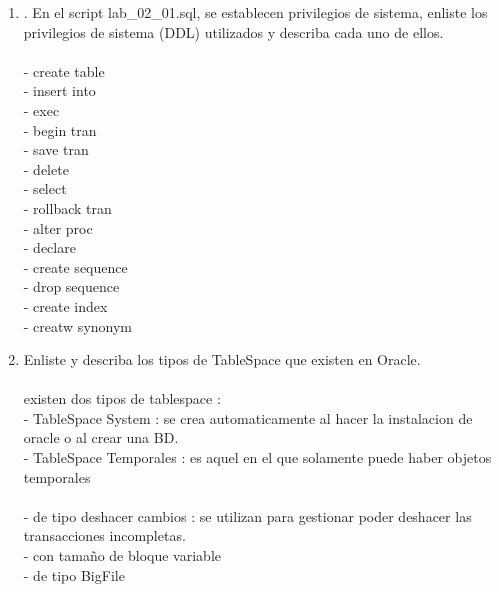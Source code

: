 \begin{enumerate}[1.]
	

	\item . En el script lab\_02\_01.sql, se establecen privilegios de sistema, enliste los privilegios de sistema (DDL) utilizados y describa cada uno de ellos.
	\\\\- create table 
	\\- insert into
	\\- exec
	\\- begin tran
	\\- save tran
	\\- delete
	\\- select
	\\- rollback tran
	\\- alter proc
	\\- declare
	\\-  create sequence
	\\- drop sequence
	\\- create index
	\\- creatw synonym
	
	\item Enliste y describa los tipos de TableSpace que existen en Oracle.
	\\\\ existen dos tipos de tablespace :
	\\- TableSpace System	: se crea automaticamente al hacer la instalacion de oracle o al crear una BD.
	\\- TableSpace Temporales	: es aquel en el que solamente puede haber objetos temporales
	\\\\- de tipo deshacer cambios	: se utilizan para gestionar poder deshacer las transacciones incompletas.
	\\- con tamaño de bloque variable
	\\- de tipo BigFile	
	

\end{enumerate} 
